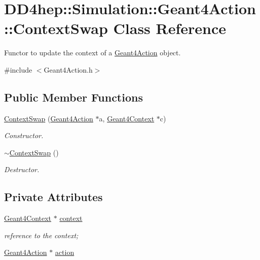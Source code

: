 \hypertarget{class_d_d4hep_1_1_simulation_1_1_geant4_action_1_1_context_swap}{}\section{D\+D4hep\+:\+:Simulation\+:\+:Geant4\+Action\+:\+:Context\+Swap Class Reference}
\label{class_d_d4hep_1_1_simulation_1_1_geant4_action_1_1_context_swap}


Functor to update the context of a \hyperlink{class_d_d4hep_1_1_simulation_1_1_geant4_action}{Geant4\+Action} object.  




{\ttfamily \#include $<$Geant4\+Action.\+h$>$}

\subsection*{Public Member Functions}
\begin{DoxyCompactItemize}
\item 
\hyperlink{class_d_d4hep_1_1_simulation_1_1_geant4_action_1_1_context_swap_a671e15a7c4487dea998af2e002aa78d6}{Context\+Swap} (\hyperlink{class_d_d4hep_1_1_simulation_1_1_geant4_action}{Geant4\+Action} $\ast$a, \hyperlink{class_d_d4hep_1_1_simulation_1_1_geant4_context}{Geant4\+Context} $\ast$c)
\begin{DoxyCompactList}\small\item\em Constructor. \end{DoxyCompactList}\item 
\hyperlink{class_d_d4hep_1_1_simulation_1_1_geant4_action_1_1_context_swap_a5f404e4ada6eb6aead85fa78d3f7b233}{$\sim$\+Context\+Swap} ()
\begin{DoxyCompactList}\small\item\em Destructor. \end{DoxyCompactList}\end{DoxyCompactItemize}
\subsection*{Private Attributes}
\begin{DoxyCompactItemize}
\item 
\hyperlink{class_d_d4hep_1_1_simulation_1_1_geant4_context}{Geant4\+Context} $\ast$ \hyperlink{class_d_d4hep_1_1_simulation_1_1_geant4_action_1_1_context_swap_aacd9a019417cad92349a8cd6597941c4}{context}
\begin{DoxyCompactList}\small\item\em reference to the context; \end{DoxyCompactList}\item 
\hyperlink{class_d_d4hep_1_1_simulation_1_1_geant4_action}{Geant4\+Action} $\ast$ \hyperlink{class_d_d4hep_1_1_simulation_1_1_geant4_action_1_1_context_swap_adbbfc954d09ad3d8b807bae2612ef23e}{action}
\end{DoxyCompactItemize}


